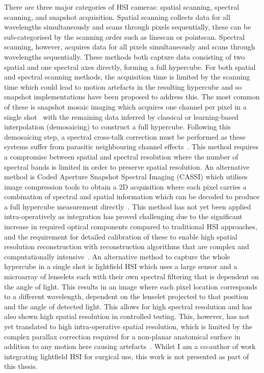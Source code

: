 There are three major categories of HSI cameras: spatial scanning, spectral scanning, and snapshot acquisition. Spatial scanning collects data for all wavelengths simultaneously and scans through pixels sequentially, these can be sub-categorised by the scanning order such as linescan or pointscan. Spectral scanning, however, acquires data for all pixels simultaneously and scans through wavelengths sequentially. These methods both capture data consisting of two spatial and one spectral axes directly, forming a full hypercube. For both spatial and spectral scanning methods, the acquisition time is limited by the scanning time which could lead to motion artefacts in the resulting hypercube and so snapshot implementations have been proposed to address this. The most common of these is snapshot mosaic imaging which acquires one channel per pixel in a single shot~\citep{Geelen2014} with the remaining data inferred by classical or learning-based~\citep{Li2021} interpolation (demosaicing) to construct a full hypercube. Following this demosaicing step, a spectral cross-talk correction must be performed as these systems suffer from parasitic neighbouring channel effects~\citep{Pichette2017}. This method requires a compromise between spatial and spectral resolution where the number of spectral bands is limited in order to preserve spatial resolution. An alternative method is Coded Aperture Snapshot Spectral Imaging (CASSI) which utilises image compression tools to obtain a 2D acquisition where each pixel carries a combination of spectral and spatial information which can be decoded to produce a full hypercube measurement directly~\citep{Song2022, Eldar2009}. This method has not yet been applied intra-operatively as integration has proved challenging due to the significant increase in required optical components compared to traditional HSI approaches, and the requirement for detailed calibration of these to enable high spatial resolution reconstruction with reconstruction algorithms that are complex and computationally intensive~\citep{Song2022}. An alternative method to capture the whole hypercube in a single shot is lightfield HSI which uses a large sensor and a microarray of lenselets each with their own spectral filtering that is dependent on the angle of light. This results in an image where each pixel location corresponds to a different wavelength, dependent on the lenselet projected to that position and the angle of detected light. This allows for high spectral resolution and has also shown high spatial resolution in controlled testing. This, however, has not yet translated to high intra-operative spatial resolution, which is limited by the complex parallax correction required for a non-planar anatomical surface in addition to any motion here causing artefacts~\citep{MacCormac2023}. Whilst I am a co-author of work integrating lightfield HSI for surgical use, this work is not presented as part of this thesis. 

